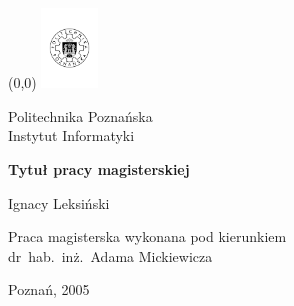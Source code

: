 
\pagestyle{empty}

\noindent
\begin{center}
\begin{textblock}{10}(0,0)
\hfill\includegraphics[width=1.5cm]{figures/logo-pp}
\end{textblock}
Politechnika Poznańska\\
Instytut Informatyki
\end{center}


\vspace{3cm}
\begin{center}
    \huge\textbf{Tytuł pracy magisterskiej}
\end{center}

\vspace{2cm}
\begin{center}
    \Large Ignacy Leksiński
\end{center}

\vfill
\begin{center}
Praca magisterska wykonana pod kierunkiem\\
dr~hab.~inż.~Adama Mickiewicza
\end{center}

\vspace{1.5cm}
\begin{center}
    Poznań, 2005
\end{center}

\cleardoublepage

\pagestyle{mythesis}
{\small\tableofcontents}
\newpage
